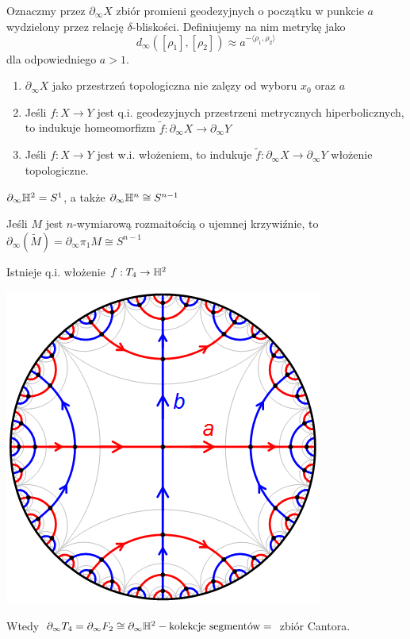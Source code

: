 \begin{definition}{}{}
  Oznaczmy przez $\partial_\infty X$ zbiór promieni geodezyjnych o początku w punkcie $a$ wydzielony przez relację $\delta$-bliskości. Definiujemy na nim metrykę jako
  $$d_\infty([\rho_1], [\rho_2])\approx a^{-\langle \rho_1, \rho_2\rangle}$$
  dla odpowiedniego $a>1$.
\end{definition}

\begin{theorem}{}{}
  \begin{enumerate}
    \item $\partial_\infty X$ jako przestrzeń topologiczna nie zalęzy od wyboru $x_0$ oraz $a$
    \item Jeśli $f:X\to Y$ jest q.i. geodezyjnych przestrzeni metrycznych hiperbolicznych, to indukuje homeomorfizm $\widetilde{f}:\partial _\infty X\to \partial_\infty Y$
    \item Jeśli $f:X\to Y$ jest w.i. włożeniem, to indukuje $\widetilde{f}:\partial_\infty X\to \partial_\infty Y$ włożenie topologiczne.
  \end{enumerate}
\end{theorem}

\begin{example}[m]
  \item $\partial_\infty \mathbb{H}^2=S^1$, a także $\partial_\infty \mathbb{H}^n\cong S^{n-1}$
  \item Jeśli $M$ jest $n$-wymiarową rozmaitością o ujemnej krzywiźnie, to $\partial_\infty(\widetilde{M})=\partial_\infty\pi_1M\cong S^{n-1}$
  \item Istnieje q.i. włożenie $f:T_4\to\mathbb{H}^2$
    \begin{center}
      \includegraphics[width=.6\textwidth]{rozdzialy/10_jednak_jestem_leniwa.png}
    \end{center}

    Wtedy $\partial_\infty T_4=\partial_\infty F_2\cong\partial_\infty \mathbb{H}^2-\text{kolekcje segmentów}=$ zbiór Cantora.
\end{example}

